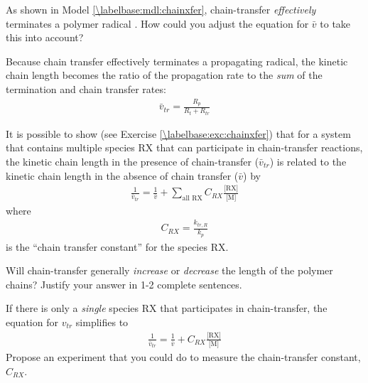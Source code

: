 \begin{activity}
\begin{model}
\end{model}

\begin{ctqs}
	\question As shown in Model \ref{\labelbase:mdl:chainxfer}, chain-transfer \emph{effectively} terminates a polymer radical .
		How could you adjust the equation for $\bar v$ to take this into account?
		
		\begin{solution}[2in]
	
			Because chain transfer effectively terminates a propagating radical, the kinetic chain length becomes the ratio of the propagation rate to the \emph{sum} of the termination and chain transfer rates:
			\begin{align*}
				\bar v_{tr} = \frac{R_p}{R_t + R_{tr}}
			\end{align*}
	
		\end{solution}
		
\end{ctqs}

\begin{infobox}
\label{\labelbase:info:vtr}

	It is possible to show (see Exercise \ref{\labelbase:exc:chainxfer}) that for a system that contains multiple species RX that can participate in chain-transfer reactions, the kinetic chain length in the presence of chain-transfer ($\bar v_{tr}$) is related to the kinetic chain length in the absence of chain transfer ($\bar v$) by
	\begin{align*}
		\frac{1}{\bar v_{tr}} = \frac{1}{\bar v} + \sum_{\text{all RX}} C_{RX}\frac{\text{[RX]}}{\text{[M]}}
	\end{align*}
	where
	\begin{align*}
		C_{RX} = \frac{k_{tr,R}}{k_p}
	\end{align*}
	is the ``chain transfer constant'' for the species RX.
	
\end{infobox}

\begin{ctqs}

	\question Will chain-transfer generally \emph{increase} or \emph{decrease} the length of the polymer chains?  Justify your answer in 1-2 complete sentences.
	
		\begin{solution}[2in]
		\end{solution}
		
	\question If there is only a \emph{single} species RX that participates in chain-transfer, the equation for $v_{tr}$ simplifies to
	\begin{align*}
		\frac{1}{\bar v_{tr}} = \frac{1}{\bar v} + C_{RX}\frac{\text{[RX]}}{\text{[M]}}
	\end{align*}
		Propose an experiment that you could do to measure the chain-transfer constant, $C_{RX}$.
		

\end{ctqs}
\end{activity}
